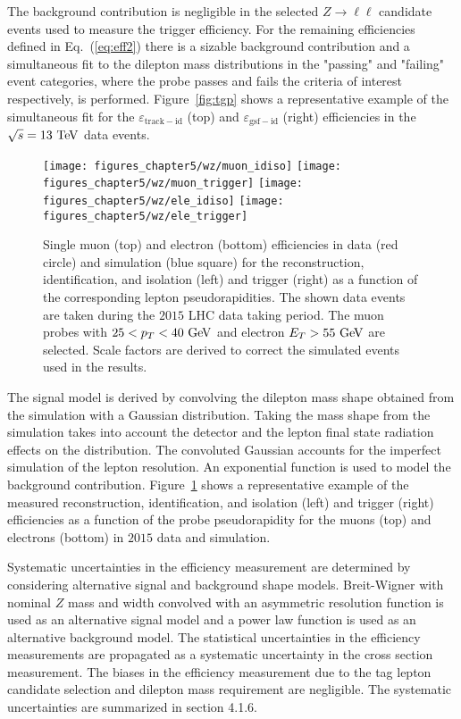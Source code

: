 The background contribution is negligible in the selected $Z \rightarrow \ell\ell$ candidate events used to measure the trigger efficiency. For the remaining efficiencies defined in Eq.~(\ref{eq:eff2}) there is a sizable background contribution and a simultaneous fit to the dilepton mass distributions in the "passing" and "failing" event categories, where the probe passes and fails the criteria of interest respectively, is performed. Figure~\ref{fig:tgp} shows a representative example of the simultaneous fit for the $\varepsilon_{\mathrm{track-id}}$ (top) and $\varepsilon_{\mathrm{gsf-id}}$ (right) efficiencies in the $\sqrt{s}=13~\mathrm{Te\kern -0.1em V}$ data events.     
\begin{figure}[h]
\centering
\texttt{[image: figures\_chapter5/wz/muon\_idiso]}
\texttt{[image: figures\_chapter5/wz/muon\_trigger]}
\texttt{[image: figures\_chapter5/wz/ele\_idiso]}
\texttt{[image: figures\_chapter5/wz/ele\_trigger]}
\caption{Single muon (top) and electron (bottom) efficiencies in data (red circle) and simulation (blue square) for the reconstruction, identification, and isolation (left) and trigger (right) as a function of the corresponding lepton pseudorapidities. The shown data events are taken during the $2015$ LHC data taking period. The muon probes with $25<p_{T}<40~\mathrm{Ge\kern -0.1em V}$ and electron $E_{T}>55~\mathrm{Ge\kern -0.1em V}$ are selected. Scale factors are derived to correct the simulated events used in the results.}
\label{fig:eff_fit}
\end{figure}
The signal model is derived by convolving the dilepton mass shape obtained from the simulation with a Gaussian distribution. Taking the mass shape from the simulation takes into account the detector and the lepton final state radiation effects on the distribution. The convoluted Gaussian accounts for the imperfect simulation of the lepton resolution. An exponential function is used to model the background contribution. Figure~\ref{fig:eff_fit} shows a representative example of the measured reconstruction, identification, and isolation (left) and trigger (right) efficiencies as a function of the probe pseudorapidity for the muons (top) and electrons (bottom) in $2015$ data and simulation.

Systematic uncertainties in the efficiency measurement are determined by considering alternative signal and background shape models. Breit-Wigner with nominal $Z$ mass and width convolved with an asymmetric resolution function is used as an alternative signal model and a power law function is used as an alternative background model. The statistical uncertainties in the efficiency measurements are propagated as a systematic uncertainty in the cross section measurement. The biases in the efficiency measurement due to the tag lepton candidate selection and dilepton mass requirement are negligible. The systematic uncertainties are summarized in section 4.1.6.    

